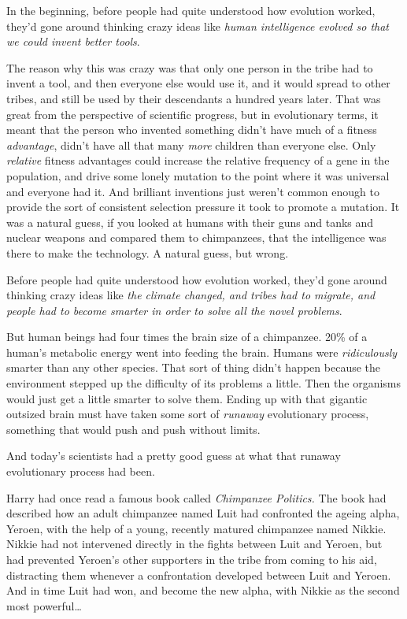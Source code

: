 In the beginning, before people had quite understood how evolution worked, they'd gone around thinking crazy ideas like \emph{human intelligence evolved so that we could invent better tools}.

The reason why this was crazy was that only one person in the tribe had to invent a tool, and then everyone else would use it, and it would spread to other tribes, and still be used by their descendants a hundred years later. That was great from the perspective of scientific progress, but in evolutionary terms, it meant that the person who invented something didn't have much of a fitness \emph{advantage}, didn't have all that many \emph{more} children than everyone else. Only \emph{relative} fitness advantages could increase the relative frequency of a gene in the population, and drive some lonely mutation to the point where it was universal and everyone had it. And brilliant inventions just weren't common enough to provide the sort of consistent selection pressure it took to promote a mutation. It was a natural guess, if you looked at humans with their guns and tanks and nuclear weapons and compared them to chimpanzees, that the intelligence was there to make the technology. A natural guess, but wrong.

Before people had quite understood how evolution worked, they'd gone around thinking crazy ideas like \emph{the climate changed, and tribes had to migrate, and people had to become smarter in order to solve all the novel problems}.

But human beings had four times the brain size of a chimpanzee. 20\% of a human's metabolic energy went into feeding the brain. Humans were \emph{ridiculously} smarter than any other species. That sort of thing didn't happen because the environment stepped up the difficulty of its problems a little. Then the organisms would just get a little smarter to solve them. Ending up with that gigantic outsized brain must have taken some sort of \emph{runaway} evolutionary process, something that would push and push without limits.

And today's scientists had a pretty good guess at what that runaway evolutionary process had been.

Harry had once read a famous book called \emph{Chimpanzee Politics.} The book had described how an adult chimpanzee named Luit had confronted the ageing alpha, Yeroen, with the help of a young, recently matured chimpanzee named Nikkie. Nikkie had not intervened directly in the fights between Luit and Yeroen, but had prevented Yeroen's other supporters in the tribe from coming to his aid, distracting them whenever a confrontation developed between Luit and Yeroen. And in time Luit had won, and become the new alpha, with Nikkie as the second most powerful{\ldots}

